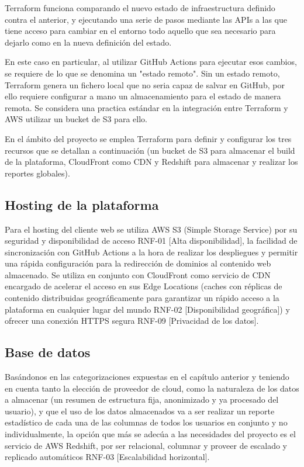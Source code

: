 Terraform funciona comparando el nuevo estado de infraestructura definido contra el anterior, y ejecutando una serie de pasos mediante las APIs a las que tiene acceso para cambiar en el entorno todo aquello que sea necesario para dejarlo como en la nueva definición del estado.

En este caso en particular, al utilizar GitHub Actions para ejecutar esos cambios, se requiere de lo que se denomina un "estado remoto". Sin un estado remoto, Terraform genera un fichero local que no seria capaz de salvar en GitHub, por ello requiere configurar a mano un almacenamiento para el estado de manera remota. Se considera una practica estándar en la integración entre Terraform y AWS utilizar un bucket de S3 para ello.

En el ámbito del proyecto se emplea Terraform para definir y configurar los tres recursos que se detallan a continuación (un bucket de S3 para almacenar el build de la plataforma, CloudFront como CDN y Redshift para almacenar y realizar los reportes globales).

\subsection{Hosting de la plataforma}

Para el hosting del cliente web se utiliza AWS S3 (Simple Storage Service) por su seguridad y disponibilidad de acceso RNF-01 [Alta disponibilidad], la facilidad de sincronización con GitHub Actions a la hora de realizar los despliegues y permitir una rápida configuración para la redirección de dominios al contenido web almacenado. Se utiliza en conjunto con CloudFront como servicio de CDN encargado de acelerar el acceso en sus Edge Locations (caches con réplicas de contenido distribuidas geográficamente para garantizar un rápido acceso a la plataforma en cualquier lugar del mundo RNF-02 [Disponibilidad geográfica]) y ofrecer una conexión HTTPS segura RNF-09 [Privacidad de los datos].

\subsection{Base de datos}

Basándonos en las categorizaciones expuestas en el capítulo anterior y teniendo en cuenta tanto la elección de proveedor de cloud, como la naturaleza de los datos a almacenar (un resumen de estructura fija, anonimizado y ya procesado del usuario), y que el uso de los datos almacenados va a ser realizar un reporte estadístico de cada una de las columnas de todos los usuarios en conjunto y no individualmente, la opción que más se adecúa a las necesidades del proyecto es el servicio de AWS Redshift, por ser relacional, columnar y proveer de escalado y replicado automáticos RNF-03 [Escalabilidad horizontal].

